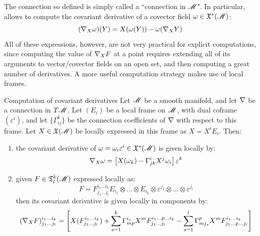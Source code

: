 The connection so defined is simply called a ``connection in $ \mathscr{M} $".
In particular,  allows to compute the covariant derivative of a covector field $ \omega \in \mathfrak{X}^*(\mathscr{M}) $:
\begin{equation}
  (\nabla_X \omega)(Y) = X(\omega(Y)) - \omega(\nabla_X Y)
\end{equation}
All of these expressions, however, are not very practical for explicit computations, since computing the value of $ \nabla_X F $ at a point requires extending all of its arguments to vector/covector fields on an open set, and then computing a great number of derivatives. A more useful computation strategy makes use of local frames.

\begin{lemma}{Computation of covariant derivatives}{}
  Let $ \mathscr{M} $ be a smooth manifold, and let $ \nabla $ be a connection in $ T\mathscr{M} $. Let $ (E_i) $ be a local frame on $ \mathscr{M} $, with dual coframe $ (\varepsilon^i) $, and let $ \{\Gamma^k_{ij}\} $ be the connection coefficients of $ \nabla $ with respect to this frame. Let $ X \in \mathfrak{X}(\mathscr{M}) $ be locally expressed in this frame as $ X = X^i E_i $. Then:
  \begin{enumerate}
    \item the covariant derivative of $ \omega = \omega_i \varepsilon^i \in \mathfrak{X}^*(\mathscr{M}) $ is given locally by:
      \begin{equation}
        \nabla_X \omega = \left[ X(\omega_k) - \Gamma^i_{jk} X^j \omega_i \right] \varepsilon^k
        \label{eq:covariant-derivative-covector}
      \end{equation}
    \item given $ F \in \mathfrak{T}^{k}_{l}(\mathscr{M}) $ expressed locally as:
      \begin{equation*}
        F = F^{i_1 \dots i_k}_{j_1 \dots j_l} E_{i_1} \otimes \dots \otimes E_{i_k} \otimes \varepsilon^{j_1} \otimes \dots \otimes \varepsilon^{j_l}
      \end{equation*}
      then its covariant derivative is given locally in components by:
      \begin{equation}
        (\nabla_X F)^{i_1 \dots i_k}_{j_1 \dots j_l} = \left[ X(F^{i_1 \dots i_k}_{j_1 \dots j_l}) + \sum_{s = 1}^k \Gamma^{i_s}_{mp} X^m F^{i_1 \dots p \dots i_k}_{j_1 \dots j_l} - \sum_{s = 1}^l \Gamma^p_{m j_s} X^m F^{i_1 \dots i_k}_{j_1 \dots p \dots j_l} \right]
        \label{eq:covariant-derivative-tensor}
      \end{equation}
  \end{enumerate}
\end{lemma}

